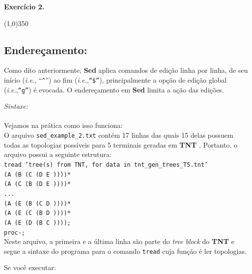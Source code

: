 \begin{refsection}
\begin{blackBlock}{\textbf{Exercício 2.}}
\begin{center}
\line(1,0){350}\\
\end{center}

\end{blackBlock}

\subsection{Endereçamento:}\label{tut2:sed:address}

	Como dito anteriormente, \textbf{Sed} aplica comandos de edição linha por linha, de seu início (\textit{i.e.}, ``\texttt{\^{}}'') ao fim (\textit{i.e.},\texttt{``\$''}), principalmente a opção de edição global (\textit{i.e.},\texttt{``g''}) é evocada. O endereçamento em \textbf{Sed} limita a ação das edições.\

\textit{Sintaxe:}\\
 \\

Vejamos na prática como isso funciona:\\

O arquivo \texttt{sed\_example\_2.txt} contém 17 linhas das quais 15 delas possuem todas as topologias possíveis para 5 terminais geradas em \textbf{TNT} \parencite{GoloboffEtAl_2008}. Portanto, o arquivo possui a seguinte estrutura:\\

\noindent\texttt{tread 'tree(s) from TNT, for data in tnt\_gen\_trees\_T5.tnt'}\\
\texttt{(A (B (C (D E ))))*}\\
\texttt{(A (C (B (D E ))))*}\\
\texttt{...}\\
\texttt{(A (E (B (C D ))))*}\\
\texttt{(A (E (C (B D ))))*}\\
\texttt{(A (E (D (B C ))));}\\
\texttt{proc-;}\\

Neste arquivo, a primeira e a última linha são parte do \textit{tree block} do \textbf{TNT} e segue a sintaxe do programa para o comando \texttt{tread} cuja função é ler topologias.

Se você executar:\\

\\


\end{refsection}
